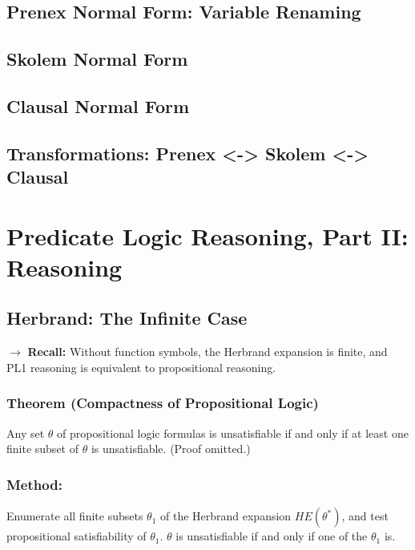 \documentclass[conference, a4paper]{styles/acmsiggraph}
\begin{document}
    \subsection{Prenex Normal Form: Variable Renaming}
    \subsection{Skolem Normal Form}
    \subsection{Clausal Normal Form}
    \subsection{Transformations: Prenex <-> Skolem <-> Clausal}
    
    
    
    
    
    
    
    
    
    
\section{Predicate Logic Reasoning, Part II: Reasoning}
    \subsection{Herbrand: The Infinite Case}
        $\rightarrow$ \textbf{Recall:} Without function symbols, the Herbrand expansion is finite, and PL1 reasoning is equivalent to propositional reasoning.
        
        \subsubsection{Theorem (Compactness of Propositional Logic)}
            Any set $\theta$ of propositional logic formulas is unsatisfiable if and only if at least one finite subset of $\theta$ is unsatisfiable. (Proof omitted.)
        
        \subsubsection{Method:}
            Enumerate all finite subsets $\theta_1$ of the Herbrand expansion $HE(\theta^*)$, and test propositional satisfiability of $\theta_1$.
            $\theta$ is unsatisfiable if and only if one of the $\theta_1$ is.
        
\end{document}
